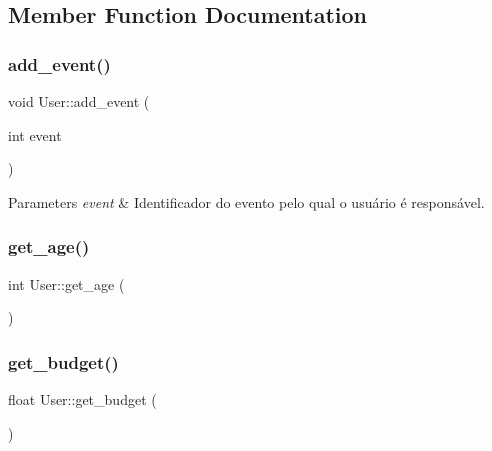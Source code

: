\subsection{Member Function Documentation}
\mbox{\label{class_user_a520082b4e1fa04c65d1a7b5075916e1f}} 
\subsubsection{\texorpdfstring{add\+\_\+event()}{add\_event()}}
{\footnotesize\ttfamily void User\+::add\+\_\+event (\begin{DoxyParamCaption}\item[{int}]{event }\end{DoxyParamCaption})}


\begin{DoxyParams}{Parameters}
{\em event} & Identificador do evento pelo qual o usuário é responsável. \\
\hline
\end{DoxyParams}
\mbox{\label{class_user_ad797f0c5651a59713defd2f219c8f6d9}} 
\subsubsection{\texorpdfstring{get\+\_\+age()}{get\_age()}}
{\footnotesize\ttfamily int User\+::get\+\_\+age (\begin{DoxyParamCaption}{ }\end{DoxyParamCaption})\hspace{0.3cm}{\ttfamily [inline]}}

\mbox{\label{class_user_a3dbc4e9226cf453c8b57a211dd4fe0d9}} 
\subsubsection{\texorpdfstring{get\+\_\+budget()}{get\_budget()}}
{\footnotesize\ttfamily float User\+::get\+\_\+budget (\begin{DoxyParamCaption}{ }\end{DoxyParamCaption})\hspace{0.3cm}{\ttfamily [inline]}}

